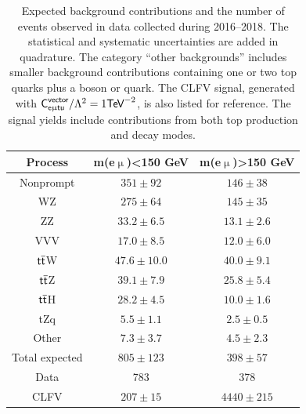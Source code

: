 \begin{table}[th]
\sffamily
\centering
\caption{Expected background contributions and the number of events observed in data collected during 2016--2018. The statistical and systematic uncertainties are added in quadrature. The category ``other backgrounds'' includes smaller background contributions containing one or two top quarks plus a boson or quark. The \ac{CLFV} signal, generated with $\textsf{C}^{\textsf{vector}}_{\textsf{e}\upmu\textsf{t{u}}}/\mathrm{\Lambda}^2=1\textsf{TeV}^{-2}$, is also listed for reference. The signal yields include contributions from both top production and decay modes.}
\begin{tabular}{ccc}
\toprule
Process & m(e$\upmu$)<150 GeV & m(e$\upmu$)>150 GeV \\
\midrule
Nonprompt & $351\pm92$ & $146\pm38$\\
WZ & $275\pm64$ & $145\pm35$\\
ZZ & $33.2\pm6.5$ & $13.1\pm2.6$\\
VVV & $17.0\pm8.5$ & $12.0\pm6.0$\\
$\textsf{t}\overline{\textsf{t}}$W & $47.6\pm10.0$ & $40.0\pm9.1$\\
$\textsf{t}\overline{\textsf{t}}$Z & $39.1\pm7.9$ & $25.8\pm5.4$\\
$\textsf{t}\overline{\textsf{t}}$H & $28.2\pm4.5$ & $10.0\pm1.6$\\
tZq & $5.5\pm1.1$ & $2.5\pm0.5$\\
Other & $7.3\pm3.7$ & $4.5\pm2.3$\\
Total expected & $805\pm123$ & $398\pm57$\\
Data & 783 & 378\\
\midrule
CLFV & $207\pm15$ & $4440\pm215$\\
\bottomrule
\end{tabular}
\label{tab:eventcount}
\end{table}